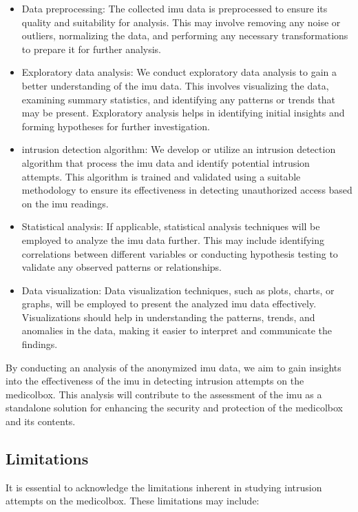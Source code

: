 \documentclass[../main.tex]{subfiles}
\begin{document}
    \begin{itemize}
    \item Data preprocessing: The collected \gls{imu} data is preprocessed to ensure its quality and suitability for analysis. This may involve removing any noise or outliers, normalizing the data, and performing any necessary transformations to prepare it for further analysis.
    
    \item Exploratory data analysis: We conduct exploratory data analysis to gain a better understanding of the \gls{imu} data. This involves visualizing the data, examining summary statistics, and identifying any patterns or trends that may be present. Exploratory analysis helps in identifying initial insights and forming hypotheses for further investigation.

    \item \gls{intrusion} detection algorithm: We develop or utilize an \gls{intrusion} detection algorithm that process the \gls{imu} data and identify potential \gls{intrusion} attempts. This algorithm is trained and validated using a suitable methodology to ensure its effectiveness in detecting unauthorized access based on the \gls{imu} readings.

    \item Statistical analysis: If applicable, statistical analysis techniques will be employed to analyze the \gls{imu} data further. This may include identifying correlations between different variables or conducting hypothesis testing to validate any observed patterns or relationships.

    \item Data visualization: Data visualization techniques, such as plots, charts, or graphs, will be employed to present the analyzed \gls{imu} data effectively. Visualizations should help in understanding the patterns, trends, and anomalies in the data, making it easier to interpret and communicate the findings.
    
    \end{itemize}

    By conducting an analysis of the anonymized \gls{imu} data,
    we aim to gain insights into the effectiveness of the
    \gls{imu} in detecting \gls{intrusion} attempts on the \gls{medicolbox}.
    This analysis will contribute to the assessment of the \gls{imu} as a
    standalone solution for enhancing the security and
    protection of the \gls{medicolbox} and its contents.

    \subsection{Limitations}        
    It is essential to acknowledge the limitations inherent in
    studying \gls{intrusion} attempts on the \gls{medicolbox}.
    These limitations may include:
        
\end{document}
